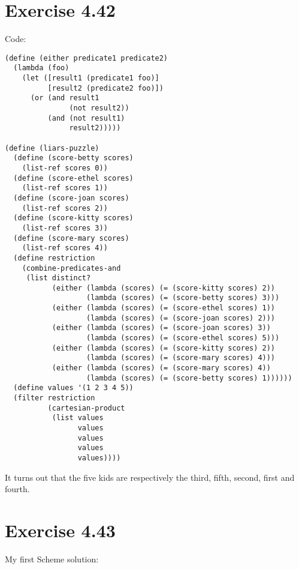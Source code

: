 \documentclass[../main.tex]{subfiles}
\begin{document}
\section{Exercise 4.42}

Code:

\begin{lstlisting}
(define (either predicate1 predicate2)
  (lambda (foo)
    (let ([result1 (predicate1 foo)]
          [result2 (predicate2 foo)])
      (or (and result1
               (not result2))
          (and (not result1)
               result2)))))

(define (liars-puzzle)
  (define (score-betty scores)
    (list-ref scores 0))
  (define (score-ethel scores)
    (list-ref scores 1))
  (define (score-joan scores)
    (list-ref scores 2))
  (define (score-kitty scores)
    (list-ref scores 3))
  (define (score-mary scores)
    (list-ref scores 4))
  (define restriction
    (combine-predicates-and
     (list distinct?
           (either (lambda (scores) (= (score-kitty scores) 2))
                   (lambda (scores) (= (score-betty scores) 3)))
           (either (lambda (scores) (= (score-ethel scores) 1))
                   (lambda (scores) (= (score-joan scores) 2)))
           (either (lambda (scores) (= (score-joan scores) 3))
                   (lambda (scores) (= (score-ethel scores) 5)))
           (either (lambda (scores) (= (score-kitty scores) 2))
                   (lambda (scores) (= (score-mary scores) 4)))
           (either (lambda (scores) (= (score-mary scores) 4))
                   (lambda (scores) (= (score-betty scores) 1))))))
  (define values '(1 2 3 4 5))
  (filter restriction
          (cartesian-product
           (list values
                 values
                 values
                 values
                 values))))
\end{lstlisting}

It turns out that the five kids are respectively the third, fifth, second, first and fourth.

\section{Exercise 4.43}

My first Scheme solution:
\end{document}
